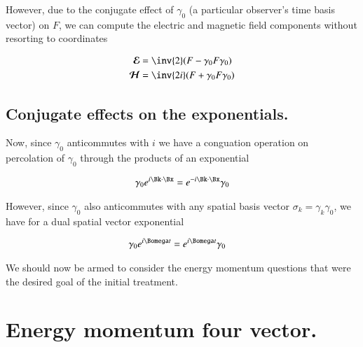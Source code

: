 \documentclass{article}
\newcommand{\EE}[0]{\boldsymbol{\mathcal{E}}}
\newcommand{\HH}[0]{\boldsymbol{\mathcal{H}}}
\begin{document}
However, due to the conjugate effect of $\gamma_0$ 
(a particular observer's time basis vector)
on $F$, 
we can compute the electric and magnetic field components without resorting to coordinates

\begin{align*}
\EE &= \inv{2}(F - \gamma_0 F \gamma_0 ) \\
\HH &= \inv{2i}(F + \gamma_0 F \gamma_0 ) \\
\end{align*}


\subsection{ Conjugate effects on the exponentials. }

Now, since $\gamma_0$ anticommutes with $i$ we have a conguation operation on percolation of $\gamma_0$ through the products of an exponential

\begin{align*}
\gamma_0 e^{i \Bk \cdot \Bx} = e^{-i \Bk \cdot \Bx} \gamma_0 
\end{align*}

However, since $\gamma_0$ also anticommutes with any spatial basis vector $\sigma_k = \gamma_k \gamma_0$, we have for a dual spatial vector exponential

\begin{align*}
\gamma_0 e^{i \Bomega t} &= e^{i \Bomega t} \gamma_0
\end{align*}

We should now be armed to consider the energy momentum questions that were the desired goal of the initial treatment.

\section{ Energy momentum four vector. }



\end{document}
